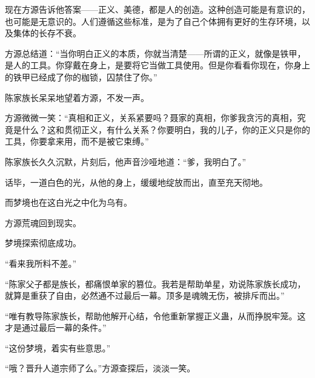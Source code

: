 \begin{this_body}
现在方源告诉他答案——正义、美德，都是人的创造。这种创造可能是有意识的，也可能是无意识的。人们遵循这些标准，是为了自己个体拥有更好的生存环境，以及集体的长存不衰。

方源总结道：“当你明白正义的本质，你就当清楚——所谓的正义，就像是铁甲，是人的工具。你穿戴在身上，是要将它当做工具使用。但是你看看你现在，你身上的铁甲已经成了你的枷锁，囚禁住了你。”

陈家族长呆呆地望着方源，不发一声。

方源微微一笑：“真相和正义，关系紧要吗？聂家的真相，你爹我贪污的真相，究竟是什么？这和贯彻正义，有什么关系？你要明白，我的儿子，你的正义只是你的工具，你要拿来用，而不是被它束缚。”

陈家族长久久沉默，片刻后，他声音沙哑地道：“爹，我明白了。”

话毕，一道白色的光，从他的身上，缓缓地绽放而出，直至充天彻地。

而梦境也在这白光之中化为乌有。

方源荒魂回到现实。

梦境探索彻底成功。

“看来我所料不差。”

“陈家父子都是族长，都痛恨单家的篡位。我若是帮助单星，劝说陈家族长成功，就算是重获了自由，必然通不过最后一幕。顶多是魂魄无伤，被排斥而出。”

“唯有教导陈家族长，帮助他解开心结，令他重新掌握正义蛊，从而挣脱牢笼。这才是通过最后一幕的条件。”

“这份梦境，着实有些意思。”

“哦？晋升人道宗师了么。”方源查探后，淡淡一笑。

\end{this_body}

